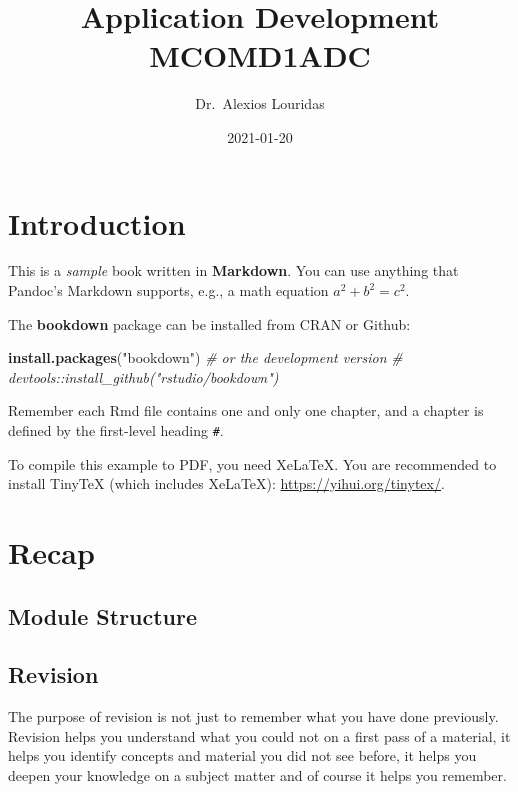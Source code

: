 \documentclass[
]{book}
\title{Application Development MCOMD1ADC}
\author{Dr.~Alexios Louridas}
\date{2021-01-20}
\newenvironment{Shaded}{\begin{snugshade}}{\end{snugshade}}
\newcommand{\CommentTok}[1]{\textcolor[rgb]{0.56,0.35,0.01}{\textit{#1}}}
\newcommand{\KeywordTok}[1]{\textcolor[rgb]{0.13,0.29,0.53}{\textbf{#1}}}
\newcommand{\NormalTok}[1]{#1}
\newcommand{\StringTok}[1]{\textcolor[rgb]{0.31,0.60,0.02}{#1}}
\begin{document}
\maketitle

{
\setcounter{tocdepth}{1}
\tableofcontents
}
\hypertarget{introduction}{%
\chapter*{Introduction}\label{introduction}}

This is a \emph{sample} book written in \textbf{Markdown}. You can use anything that Pandoc's Markdown supports, e.g., a math equation \(a^2 + b^2 = c^2\).

The \textbf{bookdown} package can be installed from CRAN or Github:

\begin{Shaded}
\begin{Highlighting}[]
\KeywordTok{install.packages}\NormalTok{(}\StringTok{"bookdown"}\NormalTok{)}
\CommentTok{# or the development version}
\CommentTok{# devtools::install_github("rstudio/bookdown")}
\end{Highlighting}
\end{Shaded}

Remember each Rmd file contains one and only one chapter, and a chapter is defined by the first-level heading \texttt{\#}.

To compile this example to PDF, you need XeLaTeX. You are recommended to install TinyTeX (which includes XeLaTeX): \url{https://yihui.org/tinytex/}.

\hypertarget{recap}{%
\chapter{Recap}\label{recap}}

\hypertarget{module-structure}{%
\section{Module Structure}\label{module-structure}}

\hypertarget{revision}{%
\section{Revision}\label{revision}}

The purpose of revision is not just to remember what you have done previously. Revision helps you understand what you could not on a first pass of a material, it helps you identify concepts and material you did not see before, it helps you deepen your knowledge on a subject matter and of course it helps you remember.
\end{document}
